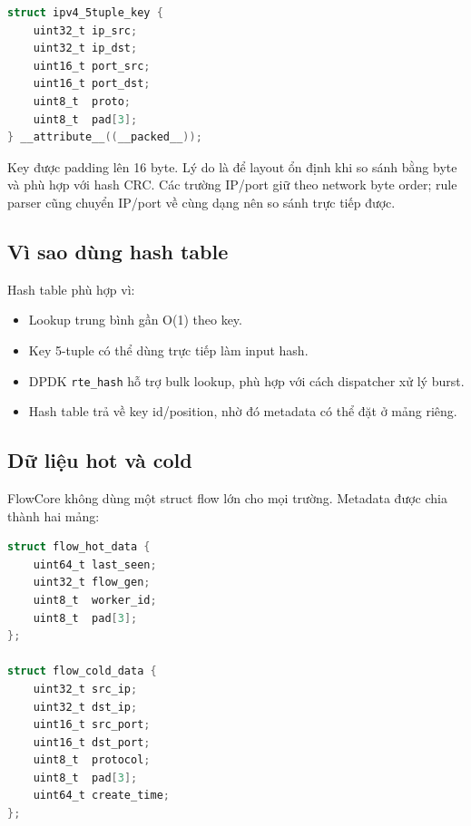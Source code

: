 \documentclass[12pt,a4paper]{report}
\DeclareRobustCommand{\code}[1]{{\small\texttt{#1}}}
\begin{document}
\begin{lstlisting}[language=C, caption={Key định danh flow IPv4 TCP/UDP}]
struct ipv4_5tuple_key {
    uint32_t ip_src;
    uint32_t ip_dst;
    uint16_t port_src;
    uint16_t port_dst;
    uint8_t  proto;
    uint8_t  pad[3];
} __attribute__((__packed__));
\end{lstlisting}

Key được padding lên 16 byte. Lý do là để layout ổn định khi so sánh bằng byte và phù hợp với hash CRC. Các trường IP/port giữ theo network byte order; rule parser cũng chuyển IP/port về cùng dạng nên so sánh trực tiếp được.

\subsection{Vì sao dùng hash table}

Hash table phù hợp vì:

\begin{itemize}
    \item Lookup trung bình gần O(1) theo key.
    \item Key 5-tuple có thể dùng trực tiếp làm input hash.
    \item DPDK \code{rte\_hash} hỗ trợ bulk lookup, phù hợp với cách dispatcher xử lý burst.
    \item Hash table trả về key id/position, nhờ đó metadata có thể đặt ở mảng riêng.
\end{itemize}

\subsection{Dữ liệu hot và cold}

FlowCore không dùng một struct flow lớn cho mọi trường. Metadata được chia thành hai mảng:

\begin{lstlisting}[language=C, caption={Metadata của flow}]
struct flow_hot_data {
    uint64_t last_seen;
    uint32_t flow_gen;
    uint8_t  worker_id;
    uint8_t  pad[3];
};

struct flow_cold_data {
    uint32_t src_ip;
    uint32_t dst_ip;
    uint16_t src_port;
    uint16_t dst_port;
    uint8_t  protocol;
    uint8_t  pad[3];
    uint64_t create_time;
};
\end{lstlisting}
\end{document}

